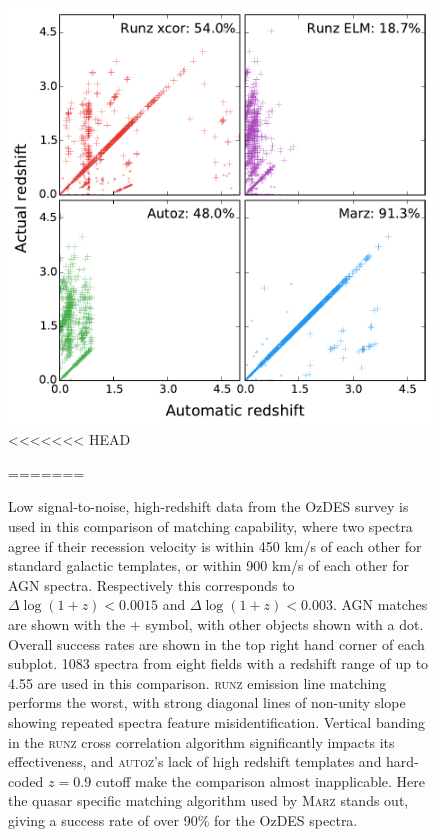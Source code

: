 \documentclass[iop]{emulateapj}
\newcommand{\runz}{\textsc{runz}}
\newcommand{\autoz}{\textsc{autoz}}
\newcommand{\marz}{\textsc{Marz}}
\begin{document}
\begin{figure}[t]
\centering
\includegraphics[width=\columnwidth]{run009Comp.pdf}
<<<<<<< HEAD
\caption{Low signal-to-noise, high-redshift data from the OzDES survey is used in this comparison of matching capability, where two spectra agree if their recession velocity is within 450 km/s of each other for standard galactic templates, or within 900 km/s of each other for AGN spectra. Respectively this corresponds to $\Delta \log(1+z) < 0.0015$ and $\Delta \log(1+z) < 0.003$. AGN matches are shown with the $+$ symbol, with other objects shown with a dot. Overall success rates are shown in the top right hand corner of each subplot. 1083 spectra from eight fields with a redshift range of up to 4.55 are used in this comparison. \runz{} emission line matching performs the worst, with strong diagonal lines of non-unity slope showing repeated spectra feature misidentification. Vertical banding in the \runz{} cross correlation algorithm significantly impacts its effectiveness, and \autoz{}'s lack of high redshift templates and hard-coded $z=0.9$ cutoff make the comparison almost inapplicable. Here the quasar specific matching algorithm used by \marz{} stands out, giving a success rate of over 90\% for the OzDES spectra.}
=======

\end{figure}
\end{document}
